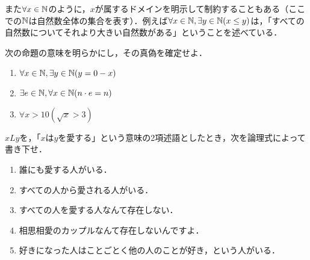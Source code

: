 \documentclass[11pt,a4paper]{jsarticle}
\begin{document}
また$\forall x \in \mathbb{N}$のように，$x$が属するドメインを明示して制約することもある（ここでの$\mathbb{N}$は自然数全体の集合を表す）．例えば$\forall x \in \mathbb{N}, \exists y \in \mathbb{N} (x \leq y)$は，「すべての自然数についてそれより大きい自然数がある」ということを述べている．


\begin{exercise}
 次の命題の意味を明らかにし，その真偽を確定せよ．
\begin{enumerate}
 \item $\forall x \in \mathbb{N}, \exists y \in \mathbb{N} (y = 0 - x)$
 \item $\exists e \in \mathbb{N}, \forall x \in \mathbb{N} (n \cdot e = n)$
 \item $\forall x > 10 (\sqrt{x} > 3)$
\end{enumerate}
\end{exercise}


\begin{exercise}
 $xLy$を，「$x$は$y$を愛する」という意味の2項述語としたとき，次を論理式によって書き下せ．
\begin{enumerate}
 \item 誰にも愛する人がいる．
 \item すべての人から愛される人がいる．
 \item すべての人を愛する人なんて存在しない．
 \item 相思相愛のカップルなんて存在しないんですよ．
 \item 好きになった人はことごとく他の人のことが好き，という人がいる．
\end{enumerate}

\end{exercise}
\end{document}
